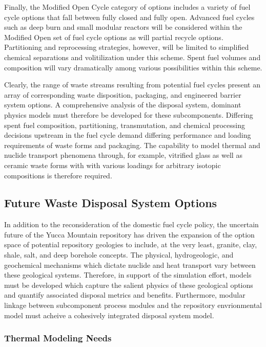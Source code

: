 Finally, the Modified Open Cycle category of options includes a 
variety of fuel cycle options that fall between fully closed and fully 
open. Advanced fuel cycles such as deep burn and small modular 
reactors will be considered within the Modified Open set of fuel cycle 
options as will partial recycle options. Partitioning and reprocessing 
strategies, however, will be limited to simplified chemical 
separations and volitilization under this scheme. Spent fuel volumes 
and composition will vary dramatically among various possibilities 
within this scheme.  

Clearly, the range of waste streams resulting from potential fuel 
cycles present an array of corresponding waste disposition, packaging, 
and engineered barrier system options. A comprehensive analysis of the 
disposal system, dominant physics models must therefore be developed 
for these subcomponents.  Differing spent fuel composition, 
partitioning, transmutation, and chemical processing decisions 
upstream in the fuel cycle demand differing performance and loading 
requirements of waste forms and packaging. The capability to model 
thermal and nuclide transport phenomena through, for example, 
vitrified glass as well as ceramic waste forms with with various 
loadings for arbitrary isotopic compositions is therefore required.  

\subsection{Future Waste Disposal System Options}

In addition to the reconsideration of the domestic fuel cycle policy, 
the uncertain future of the Yucca Mountain repository has driven the 
expansion of the option space of potential repository geologies to 
include, at the very least, granite, clay, shale, salt, and deep 
borehole concepts. The physical, hydrogeologic, and geochemical 
mechanisms which dictate nuclide and heat transport vary between these 
geological systems.  Therefore, in support of the simulation effort, 
models must be developed which capture the salient physics of these 
geological options and quantify associated disposal metrics and 
benefits.  Furthermore, modular linkage between subcomponent process 
modules and the repository envrionmental model must acheive a 
cohesively integrated disposal system model.  

\subsubsection{Thermal Modeling Needs}


